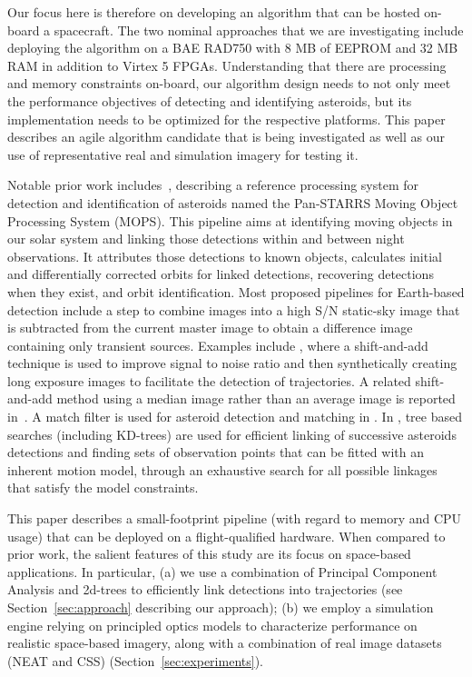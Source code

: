 \documentclass{article}
\begin{document}
Our focus here is therefore on developing an algorithm that can be hosted on-board a spacecraft. The two nominal approaches that we are investigating include deploying the algorithm on a BAE RAD750 with 8 MB of EEPROM and 32 MB RAM in addition to Virtex 5 FPGAs. Understanding that there are processing and memory constraints on-board, our algorithm design needs to not only meet the performance objectives of detecting and identifying asteroids, but its implementation needs to be optimized for the respective platforms. This paper describes an agile algorithm candidate that is being investigated as well as our use of representative real and simulation imagery for testing it.

Notable prior work includes~\cite{denneau2013pan}, describing a reference processing system for detection and identification of asteroids named the Pan-STARRS Moving Object Processing System (MOPS). This pipeline aims at identifying moving objects in our solar system and linking those detections within and between night observations. It attributes those detections to known objects, calculates initial and differentially corrected orbits for linked detections, recovering detections when they exist, and orbit identification. Most proposed pipelines for Earth-based detection include a step to combine images into	 a high S/N static-sky image that is subtracted from the current master image to obtain a difference image containing only transient sources. Examples include \cite{shao2014finding}, where a shift-and-add technique is used to improve  signal to noise ratio and then synthetically creating long exposure images to facilitate the detection of trajectories. A related shift-and-add method using a median  image rather than an average image is reported in~\cite{yanagisawa2005automatic}. A match filter is used for asteroid detection and matching in \cite{gural2005matched}. In \cite{kubica2005variable,kubica2005multiple,kubica2007efficient}, tree based searches (including KD-trees) are used for efficient linking of successive asteroids detections and finding sets of observation points that can be fitted with an inherent motion model, through an exhaustive search for all possible linkages that satisfy the model constraints.
	
	This paper describes a small-footprint pipeline (with regard to memory and CPU usage) that can be deployed on a flight-qualified hardware. When compared to prior work, the salient features of this study are its focus on space-based applications. In particular, (a) we use a combination of Principal Component Analysis and 2d-trees to efficiently link detections into trajectories (see Section~\ref{sec:approach} describing our approach); (b) we employ a simulation engine relying on principled optics models to characterize  performance on realistic space-based imagery, along with a combination of real image datasets (NEAT and CSS) (Section~\ref{sec:experiments}).
		
\end{document}
